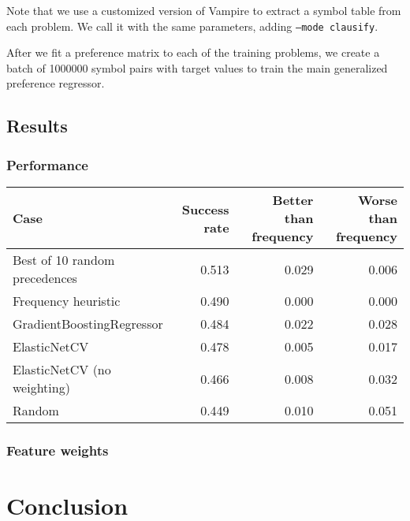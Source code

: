 Note that we use a customized version of Vampire to extract a symbol table from each problem.
We call it with the same parameters, adding \texttt{--mode clausify}.

After we fit a preference matrix to each of the training problems,
we create a batch of 1000000 symbol pairs with target values
to train the main generalized preference regressor.

\subsection{Results}

\subsubsection{Performance}

\begin{tabular}{lrrr}
	Case & Success rate & Better than frequency & Worse than frequency \\
	\hline
	Best of 10 random precedences & 0.513 & 0.029 & 0.006 \\
	Frequency heuristic & 0.490 & 0.000 & 0.000 \\
	GradientBoostingRegressor & 0.484 & 0.022 & 0.028 \\
	ElasticNetCV & 0.478 & 0.005 & 0.017 \\
	ElasticNetCV (no weighting) & 0.466 & 0.008 & 0.032 \\
	Random & 0.449 & 0.010 & 0.051 \\
\end{tabular}

\subsubsection{Feature weights}


\section{Conclusion}


\glsaddall
\printglossaries





